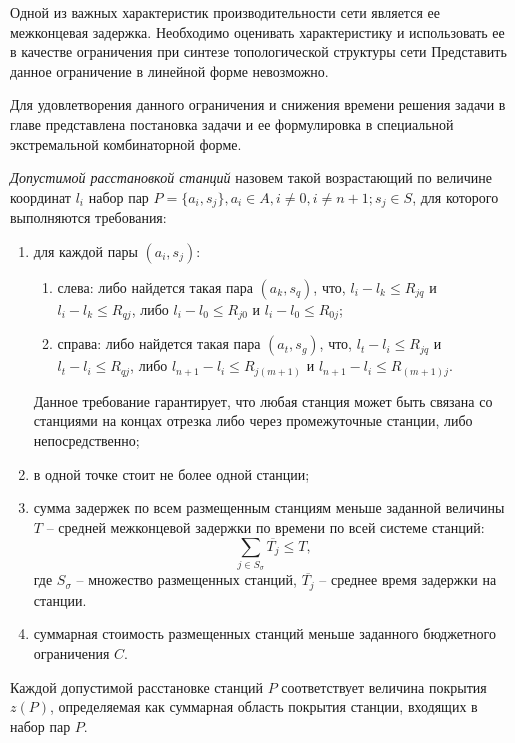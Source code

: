 Одной из важных характеристик производительности сети является ее межконцевая задержка. Необходимо оценивать характеристику и использовать ее в качестве ограничения при синтезе топологической структуры сети Представить данное ограничение в линейной форме невозможно. 

Для удовлетворения данного ограничения и снижения времени решения задачи в главе представлена постановка задачи и ее формулировка в специальной экстремальной комбинаторной форме.

\textit{Допустимой расстановкой станций} назовем такой возрастающий по величине координат $l_i$  набор пар $P = \{a_i, s_j\},a_i \in A,i \neq 0,i \neq n+1;s_j \in S$, для которого выполняются требования:

\begin{enumerate}
    \item  для каждой пары $(a_i,s_j)$:
        \begin{enumerate}
            \item слева: либо найдется такая пара $(a_k,s_q)$, что, $l_i - l_k \leqslant R_{jq}$  и $l_i - l_k  \leqslant R_{qj}$, либо $l_i-l_0 \leqslant R_{j0}$ и $l_i - l_0 \leqslant R_{0j}$;
            \item справа: либо найдется такая пара $(a_t,s_g)$, что, $l_t-l_i \leqslant R_{jq}$ и $l_t - l_i \leqslant R_{qj}$, либо $l_{n+1}-l_i \leqslant R_{j(m+1)}$ и $l_{n+1}-l_i \leqslant R_{(m+1)j}$. 
        \end{enumerate}

Данное требование гарантирует, что любая станция может быть связана со станциями на концах отрезка либо через промежуточные станции, либо непосредственно;
    \item в одной точке стоит не более одной станции;
    \item сумма задержек по всем размещенным станциям меньше заданной величины $T$ – средней межконцевой задержки по времени по всей системе станций:
    \begin{displaymath}
        \label{eq:part3_e2e_delay}
        \sum\limits_{j \in S_\sigma} \overline{T_j} \leqslant T,
    \end{displaymath}
где $S_\sigma$ – множество размещенных станций, $\overline{T_j}$ -- среднее время задержки на станции.
    \item суммарная стоимость размещенных станций меньше заданного бюджетного ограничения $C$.
\end{enumerate}

Каждой допустимой расстановке станций $P$ соответствует величина покрытия $z(P)$, определяемая как суммарная область покрытия станции, входящих в набор пар $P$.

